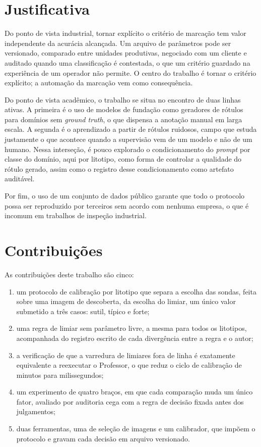 \section{Justificativa}

Do ponto de vista industrial, tornar explícito o critério de marcação tem valor independente da acurácia alcançada. Um arquivo de parâmetros pode ser versionado, comparado entre unidades produtivas, negociado com um cliente e auditado quando uma classificação é contestada, o que um critério guardado na experiência de um operador não permite. O centro do trabalho é tornar o critério explícito; a automação da marcação vem como consequência.

Do ponto de vista acadêmico, o trabalho se situa no encontro de duas linhas ativas. A primeira é o uso de modelos de fundação como geradores de rótulos para domínios sem \textit{ground truth}, o que dispensa a anotação manual em larga escala. A segunda é o aprendizado a partir de rótulos ruidosos, campo que estuda justamente o que acontece quando a supervisão vem de um modelo e não de um humano. Nessa interseção, é pouco explorado o condicionamento do \textit{prompt} por classe do domínio, aqui por litotipo, como forma de controlar a qualidade do rótulo gerado, assim como o registro desse condicionamento como artefato auditável.

Por fim, o uso de um conjunto de dados público \cite{dataset_araujo2023} garante que todo o protocolo possa ser reproduzido por terceiros sem acordo com nenhuma empresa, o que é incomum em trabalhos de inspeção industrial.

\section{Contribuições}
\label{sec:contribuicoes}

As contribuições deste trabalho são cinco:

\begin{enumerate}
  \item um protocolo de calibração por litotipo que separa a escolha das sondas, feita sobre uma imagem de descoberta, da escolha do limiar, um único valor submetido a três casos: sutil, típico e forte;
  \item uma regra de limiar sem parâmetro livre, a mesma para todos os litotipos, acompanhada do registro escrito de cada divergência entre a regra e o autor;
  \item a verificação de que a varredura de limiares fora de linha é exatamente equivalente a reexecutar o Professor, o que reduz o ciclo de calibração de minutos para milissegundos;
  \item um experimento de quatro braços, em que cada comparação muda um único fator, avaliado por auditoria cega com a regra de decisão fixada antes dos julgamentos;
  \item duas ferramentas, uma de seleção de imagens e um calibrador, que impõem o protocolo e gravam cada decisão em arquivo versionado.
\end{enumerate}

